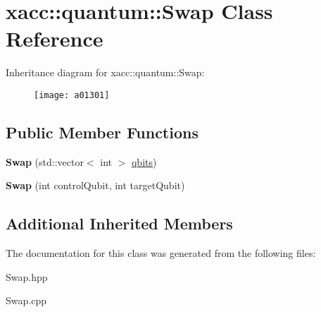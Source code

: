 \hypertarget{a01301}{}\section{xacc\+:\+:quantum\+:\+:Swap Class Reference}
\label{a01301}
Inheritance diagram for xacc\+:\+:quantum\+:\+:Swap\+:\begin{figure}[H]
\begin{center}
\leavevmode
\texttt{[image: a01301]}
\end{center}
\end{figure}
\subsection*{Public Member Functions}
\begin{DoxyCompactItemize}
\item 
\mbox{\label{a01301_a5c35a23a635f235a5615be65e769c121}} 
{\bfseries Swap} (std\+::vector$<$ int $>$ \hyperlink{a01253_a2a56be6c2519ea65df4d06f4abae1393}{qbits})
\item 
\mbox{\label{a01301_ac19efe303b798e14441a2c235b5ba7f3}} 
{\bfseries Swap} (int control\+Qubit, int target\+Qubit)
\end{DoxyCompactItemize}
\subsection*{Additional Inherited Members}


The documentation for this class was generated from the following files\+:\begin{DoxyCompactItemize}
\item 
Swap.\+hpp\item 
Swap.\+cpp\end{DoxyCompactItemize}
